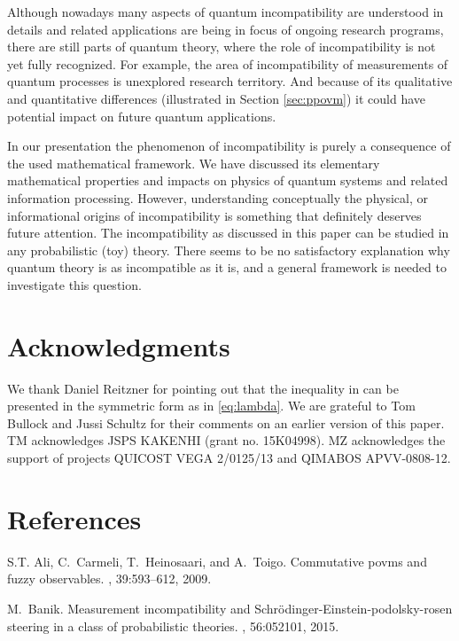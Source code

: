 \documentclass[12pt]{article}
\theoremstyle{definition}
\begin{document}
{Although nowadays many aspects of quantum incompatibility are 
understood in details and related applications are being in focus of 
ongoing research programs, there are still parts of quantum theory, where the role of incompatibility is not yet fully recognized. For example, the area 
of incompatibility of measurements of quantum processes is unexplored research territory. 
And because of its qualitative and quantitative 
differences (illustrated in Section \ref{sec:ppovm}) it could have potential 
impact on future quantum applications.
  
In our presentation the phenomenon of incompatibility 
is purely a consequence of the used mathematical framework. We have 
discussed its elementary mathematical properties and 
impacts on physics of quantum systems and related information 
processing. However, understanding conceptually the physical, 
or informational origins of incompatibility is something that 
definitely deserves future attention. The incompatibility as discussed 
in this paper can be studied in any probabilistic 
(toy) theory. 
There seems to be no satisfactory explanation why quantum theory is as incompatible as it is, and a general framework is needed to investigate this question.


\section*{Acknowledgments}

We thank Daniel Reitzner for pointing out that the inequality in \cite{CaHeTo12} can be presented in the symmetric form as in \eqref{eq:lambda}. We are grateful to Tom Bullock and Jussi Schultz for their comments on an earlier version of this paper. 
TM acknowledges JSPS KAKENHI (grant no. 15K04998).
MZ acknowledges the support of projects QUICOST VEGA 2/0125/13 and QIMABOS APVV-0808-12.

\section*{References}

\begin{thebibliography}{10}

S.T. Ali, C.~Carmeli, T.~Heinosaari, and A.~Toigo.
\newblock Commutative povms and fuzzy observables.
, 39:593--612, 2009.

M.~Banik.
\newblock Measurement incompatibility and
  {S}chr\"odinger-{E}instein-podolsky-rosen steering in a class of
  probabilistic theories.
, 56:052101, 2015.


\end{thebibliography}}
\end{document}
